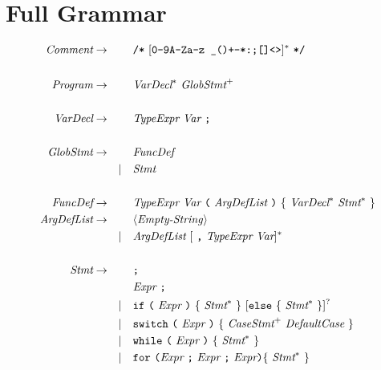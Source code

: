\section{Full Grammar}

\begin{align*}
  \Comment                & \SSra &         & \CCdiv \CCasterisk \ [\mbtt{0-9A-Za-z\ \_()+-*:;[]<>}]^* \ \CCasterisk \CCdiv \\
  \\
  \Program                & \SSra &         & \VarDeclaration^* \ \GlobalStatement^+ \\
  \\
  \VarDeclaration         & \SSra &         & \TypeExpression \ \Variable \ \CCscolon \\
  \\
  \GlobalStatement        & \SSra &         & \FunctionDefinition \\
                          &       & \SSmid  & \Statement \\
  \\
  \FunctionDefinition     & \SSra &         & \TypeExpression \ \Variable \ \CClparen \ \ArgumentDefinitionList \ \CCrparen \ \SSFUnctionStatementBlock \\
  \ArgumentDefinitionList & \SSra &         & \CCEmptyString \\
                          &       & \SSmid  & \ArgumentDefinitionList \ [\ \CCcomma \ \TypeExpression \ \Variable]^* \\
  \\
  \Statement              & \SSra &         & \CCscolon \\
                          &       &         & \Expression \ \CCscolon \\
                          &       & \SSmid  & \CCif \ \CClparen \ \Expression \ \CCrparen \ 
                                                \SSStatementBlock \ [\CCelse \ \SSStatementBlock]^? \\
                          &       & \SSmid  & \CCswitch \ \CClparen \ \Expression \ \CCrparen \
                                                \CClbrace \ \CaseStatement^+ \ \DefaultCaseStatement \ \CCrbrace \\
                          &       & \SSmid  & \CCwhile \ \CClparen \ \Expression \ \CCrparen \ \SSStatementBlock \\
                          &       & \SSmid  & \CCfor \ \CClparen \Expression \ \CCscolon \ \Expression \ \CCscolon \ \Expression \CCrparen \SSStatementBlock \\

\end{align*}

